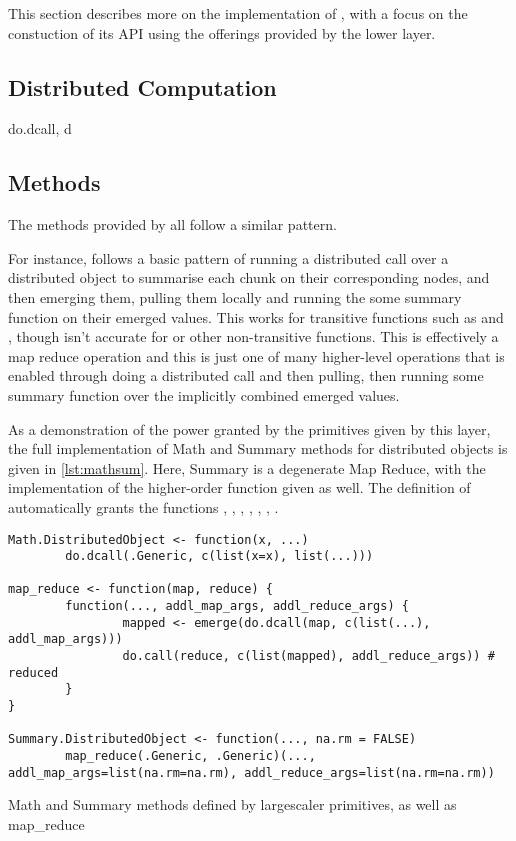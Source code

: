 This section describes more on the implementation of , with a focus on the constuction of its API using the offerings provided by the lower layer.

\subsection{Distributed Computation}

do.dcall, d

\subsection{Methods}

The methods provided by \lsr all follow a similar pattern.

For instance,  follows a basic pattern of running a distributed call over a distributed object to summarise each chunk on their corresponding nodes, and then emerging them, pulling them locally and running the some summary function on their  emerged values.
This works for transitive functions such as  and , though isn't accurate for  or other non-transitive functions.
This is effectively a map reduce operation and this is just one of many higher-level operations that is enabled through doing a distributed call and then pulling, then running some summary function over the implicitly combined emerged values.

As a demonstration of the power granted by the primitives given by this layer, the full implementation of Math and Summary methods for distributed objects is given in \cref{lst:mathsum}.
Here, Summary is a degenerate Map Reduce, with the implementation of the higher-order  function given as well. The definition of  automatically grants the functions , , , , , , . 

\begin{listing}
\begin{verbatim}
Math.DistributedObject <- function(x, ...)
        do.dcall(.Generic, c(list(x=x), list(...)))

map_reduce <- function(map, reduce) {
        function(..., addl_map_args, addl_reduce_args) {
                mapped <- emerge(do.dcall(map, c(list(...), addl_map_args)))
                do.call(reduce, c(list(mapped), addl_reduce_args)) # reduced
        }
}

Summary.DistributedObject <- function(..., na.rm = FALSE)  
        map_reduce(.Generic, .Generic)(..., addl_map_args=list(na.rm=na.rm), addl_reduce_args=list(na.rm=na.rm)) 
\end{verbatim}
\caption{Math and Summary methods defined by largescaler primitives, as well as map\_reduce}
\label{lst:mathsum}
\end{listing}
